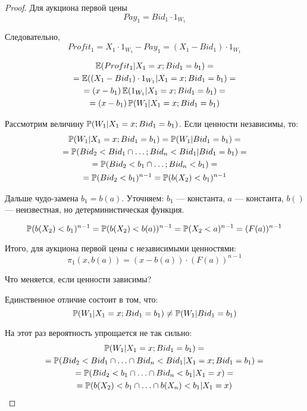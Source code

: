 \begin{proof}
Для аукциона первой цены
\begin{equation}
Pay_{1}=Bid_{1}\cdot 1_{W_{1}}
\end{equation}

Следовательно,
\begin{equation}
Profit_{1}=X_{1}\cdot 1_{W_{1}}-Pay_{1}=(X_{1}-Bid_{1})\cdot 1_{W_{1}}
\end{equation}


\begin{multline}
\E(Profit_{1}|X_{1}=x ; Bid_{1}=b_{1})=\\
=\E((X_{1}-Bid_{1})\cdot 1_{W_{1}}|X_{1}= x ; Bid_{1}=b_{1})=\\
= (x-b_{1})\E(1_{W_{1}}|X_{1}=x ; Bid_{1}=b_{1})=\\
=(x-b_{1})\P(W_{1}|X_{1}=x ; Bid_{1}=b_{1})
\end{multline}

Рассмотрим величину $ \P(W_{1}|X_{1}=x ; Bid_{1}=b_{1}) $. Если ценности независимы, то:
\begin{multline}
\P(W_{1}|X_{1}=x ; Bid_{1}=b_{1})=\P(W_{1}|Bid_{1}=b_{1})= \\
=\P(Bid_{2}<Bid_{1}\cap \ldots ; Bid_{n}<Bid_{1}|Bid_{1}=b_{1})=\\
=\P(Bid_{2}<b_{1}\cap \ldots ; Bid_{n}<b_{1})=\\
=\P(Bid_{2}<b_{1})^{n-1}=\P(b(X_{2})<b_{1})^{n-1}
\end{multline}

Дальше чудо-замена $ b_{1}=b(a) $. Уточняем: $ b_{1} $ — константа, $ a $ — константа, $ b() $ — неизвестная, но детерминистическая функция.

\begin{equation}
\P(b(X_{2})<b_{1})^{n-1}=\P(b(X_{2})<b(a))^{n-1}=\P(X_{2}<a)^{n-1}=(F(a))^{n-1}
\end{equation}

Итого, для аукциона первой цены с независимыми ценностями:
\begin{equation}
\pi_{1}(x,b(a))=(x-b(a))\cdot (F(a))^{n-1}
\end{equation}

Что меняется, если ценности зависимы?

Единственное отличие состоит в том, что:
\begin{equation}
\P(W_{1}|X_{1}=x ; Bid_{1}=b_{1}) \neq \P(W_{1}|Bid_{1}=b_{1})
\end{equation}

На этот раз вероятность упрощается не так сильно:
\begin{multline}
\P(W_{1}|X_{1}=x ; Bid_{1}=b_{1})=\\
=\P(Bid_{2}<Bid_{1}\cap \ldots \cap Bid_{n}<Bid_{1}|X_{1}=x ; Bid_{1}=b_{1})=\\
=\P(Bid_{2}<b_{1}\cap \ldots \cap Bid_{n}<b_{1}|X_{1}=x)=\\
=\P(b(X_{2})<b_{1}\cap \ldots \cap b(X_{n})<b_{1}|X_{1}=x)
\end{multline}


\end{proof}

